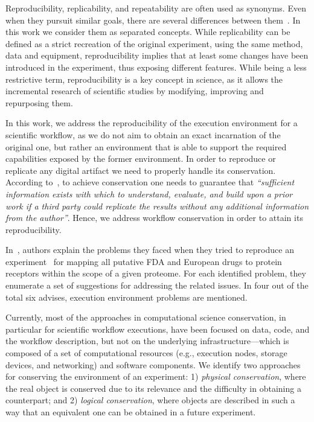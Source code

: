
Reproducibility, replicability, and repeatability are often used as synonyms. Even when they
pursuit similar goals, there are several differences between them~\cite{Drummond2011}. In this work we consider them
as separated concepts. While replicability can be defined as a
strict recreation of the original experiment, using the same method, data and equipment, reproducibility
implies that at least some changes have been introduced in the experiment, thus exposing 
different features.  While being a less restrictive term, reproducibility
is a key concept in science, as it allows the incremental research of scientific studies
by modifying, improving and repurposing them. 

In this work, we address the reproducibility of the execution environment for a scientific workflow, 
as we do not aim to obtain an exact incarnation of the original one, but rather an 
environment that is able to support the required capabilities exposed by the former 
environment. In order to reproduce or replicate any digital artifact we need to properly handle its conservation.
According to~\cite{King1995}, to achieve conservation one needs to guarantee that \emph{``sufficient information
exists with which to understand, evaluate, and build upon a prior work if a third party could replicate
 the results without any additional information from the author''}. Hence, we address workflow conservation
in order to attain its reproducibility.


In~\cite{Garijo2013}, authors explain the problems they faced when they tried to 
reproduce an experiment~\cite{drugomePrimer} for mapping all putative FDA 
and European drugs to protein receptors within the scope of a given proteome. For 
each identified problem, they enumerate a set of suggestions for addressing the related
issues. In four out of the total six advises, execution environment problems are mentioned.

Currently, most of the approaches in computational science conservation, in particular 
for scientific workflow executions, have been focused on data, code, and the workflow 
description, but not on the underlying infrastructure---which is composed of a set of 
computational resources (e.g., execution nodes, storage devices, and networking) and 
software components. We identify two approaches for conserving the environment of an 
experiment: 1) \emph{physical conservation}, where the real object is conserved due to 
its relevance and the difficulty in obtaining a counterpart; and 2) \emph{logical conservation}, 
where objects are described in such a way that an equivalent one can be obtained in a 
future experiment.

